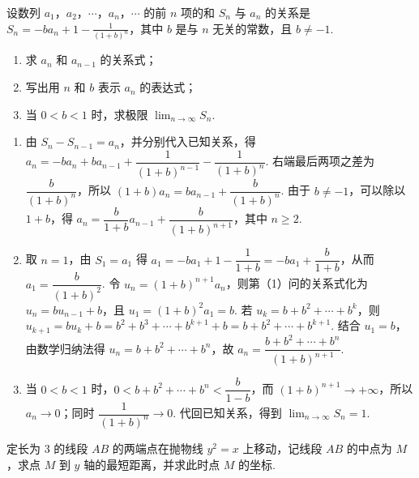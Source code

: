 \begin{problem}

设数列 \(a_1\)，\(a_2\)，\(\cdots\)，\(a_n\)，\(\cdots\) 的前 \(n\) 项的和 \(S_n\) 与 \(a_n\) 的关系是 \(S_n = -ba_n + 1 - \frac{1}{(1+b)^n}\)，其中 \(b\) 是与 \(n\) 无关的常数，且 \(b \neq -1\).

\begin{enumerate}
\item 求 \(a_n\) 和 \(a_{n-1}\) 的关系式；
\item 写出用 \(n\) 和 \(b\) 表示 \(a_n\) 的表达式；
\item 当 \(0 < b < 1\) 时，求极限 \(\displaystyle\lim_{n\to\infty} S_n\).
\end{enumerate}
\end{problem}

\begin{solution}
\begin{enumerate}
\item 由 \(S_n-S_{n-1}=a_n\)，并分别代入已知关系，得
\(a_n=-ba_n+ba_{n-1}+\dfrac{1}{(1+b)^{n-1}}-\dfrac{1}{(1+b)^n}\). 右端最后两项之差为
\(\dfrac{b}{(1+b)^n}\)，所以
\((1+b)a_n=ba_{n-1}+\dfrac{b}{(1+b)^n}\). 由于 \(b\ne-1\)，可以除以 \(1+b\)，得
\(a_n=\dfrac{b}{1+b}a_{n-1}+\dfrac{b}{(1+b)^{n+1}}\)，其中 \(n\geqslant2\).
\item 取 \(n=1\)，由 \(S_1=a_1\) 得
\(a_1=-ba_1+1-\dfrac{1}{1+b}=-ba_1+\dfrac{b}{1+b}\)，从而
\(a_1=\dfrac{b}{(1+b)^2}\). 令 \(u_n=(1+b)^{n+1}a_n\)，则第（1）问的关系式化为
\(u_n=bu_{n-1}+b\)，且 \(u_1=(1+b)^2a_1=b\). 若 \(u_k=b+b^2+\cdots+b^k\)，则
\(u_{k+1}=bu_k+b=b^2+b^3+\cdots+b^{k+1}+b=b+b^2+\cdots+b^{k+1}\). 结合 \(u_1=b\)，由数学归纳法得
\(u_n=b+b^2+\cdots+b^n\)，故
\(a_n=\dfrac{b+b^2+\cdots+b^n}{(1+b)^{n+1}}\).
\item 当 \(0<b<1\) 时，\(0<b+b^2+\cdots+b^n<\dfrac{b}{1-b}\)，而 \((1+b)^{n+1}\to+\infty\)，所以 \(a_n\to0\)；同时 \(\dfrac{1}{(1+b)^n}\to0\). 代回已知关系，得到
\(\displaystyle\lim_{n\to\infty}S_n=1\).
\end{enumerate}
\end{solution}

\begin{problem}

定长为 \(3\) 的线段 \(AB\) 的两端点在抛物线 \(y^2 = x\) 上移动，记线段 \(AB\) 的中点为 \(M\)，求点 \(M\) 到 \(y\) 轴的最短距离，并求此时点 \(M\) 的坐标.
\end{problem}

